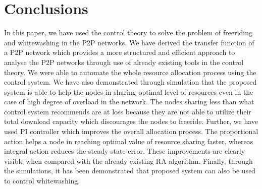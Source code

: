 \documentclass[journal]{IEEEtran}
\begin{document}
\section{Conclusions}
\label{conclusion}
In this paper, we have used the control theory to solve the problem of freeriding and whitewashing in the P2P networks. We have derived the transfer function of a P2P network which provides a more structured and efficient approach to analyse the P2P networks through use of already existing tools in the control theory. We were able to automate the whole resource allocation process using the control system. We have also demonstrated through simulation that the proposed system is able to help the nodes in sharing optimal level of resources even in the case of high degree of overload in the network. The nodes sharing less than what control system recommends are at loss because they are not able to utilize their total download capacity which discourages the nodes to freeride. Further, we have used PI controller which improves the overall allocation process. The proportional action helps a node in reaching optimal value of resource sharing faster, whereas integral action reduces the steady state error. These improvements are clearly visible when compared with the already existing RA \cite{Satsiou} algorithm. Finally, through the simulations, it has been demonstrated that proposed system can also be used to control whitewashing.











\ifCLASSOPTIONcaptionsoff
  \newpage
\fi







\end{document}
